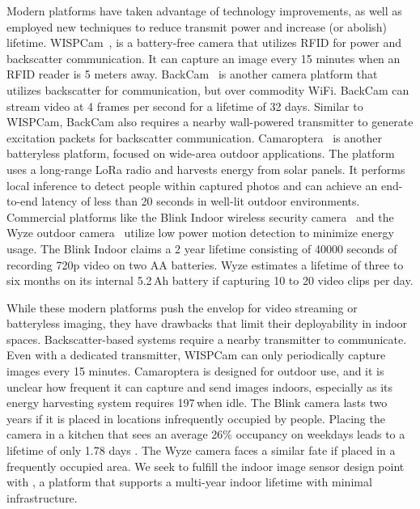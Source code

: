 Modern platforms have taken advantage of technology improvements, as well as employed new techniques to reduce transmit power and increase (or abolish) lifetime. WISPCam~\cite{naderiparizi2015wispcam}, is a battery-free camera that utilizes RFID for power and backscatter communication. It can capture an image every 15 minutes when an RFID reader is 5 meters away. BackCam~\cite{josephson2019wireless} is  another camera platform that utilizes backscatter for communication, but over commodity WiFi. BackCam can stream video at 4 frames per second for a lifetime of 32 days. Similar to WISPCam, BackCam also requires a nearby wall-powered transmitter to generate excitation packets for backscatter communication. Camaroptera~\cite{nardello2019camaroptera} is another batteryless platform, focused on wide-area outdoor applications. The platform uses a long-range LoRa radio and harvests energy from solar panels. It performs local inference to detect people within captured photos and can achieve an end-to-end latency of less than 20 seconds in well-lit outdoor environments. Commercial platforms like the Blink Indoor wireless security camera~\cite{blinkindoor} and the Wyze outdoor camera~\cite{wyzeoutdoor} utilize low power motion detection to minimize energy usage. The Blink Indoor claims a 2 year lifetime consisting of 40000 seconds of recording 720p video on two AA batteries. Wyze estimates a lifetime of three to six months on its internal 5.2\,Ah battery if capturing 10 to 20 video clips per day.

While these modern platforms push the envelop for video streaming or batteryless imaging, they have drawbacks that limit their deployability in indoor spaces. Backscatter-based systems require a nearby transmitter to communicate. Even with a dedicated transmitter, WISPCam can only periodically capture images every 15 minutes. Camaroptera is designed for outdoor use, and it is unclear how frequent it can capture and send images indoors, especially as its energy harvesting system requires 197\,\uW when idle. The Blink camera lasts two years if it is placed in locations infrequently occupied by people. Placing the camera in a kitchen that sees an average 26\% occupancy on weekdays leads to a lifetime of only 1.78 days \cite{josephson2019wireless}. The Wyze camera faces a similar fate if placed in a frequently occupied area.
We seek to fulfill the indoor image sensor design point with \name{}, a platform that supports a multi-year indoor lifetime with minimal infrastructure.